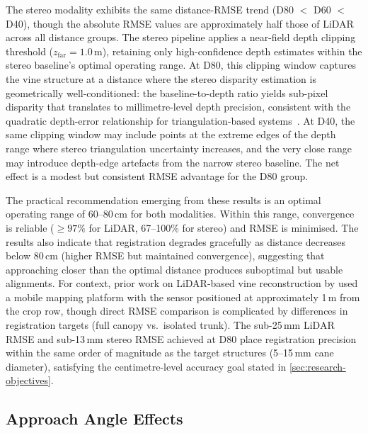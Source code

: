 The stereo modality exhibits the same distance-RMSE trend (D80 $<$ D60 $<$ D40), though the absolute RMSE values are approximately half those of LiDAR across all distance groups. The stereo pipeline applies a near-field depth clipping threshold ($z_\text{far} = 1.0$\,m), retaining only high-confidence depth estimates within the stereo baseline's optimal operating range. At D80, this clipping window captures the vine structure at a distance where the stereo disparity estimation is geometrically well-conditioned: the baseline-to-depth ratio yields sub-pixel disparity that translates to millimetre-level depth precision, consistent with the quadratic depth-error relationship for triangulation-based systems~\cite{hartleyMultipleViewGeometry2004}. At D40, the same clipping window may include points at the extreme edges of the depth range where stereo triangulation uncertainty increases, and the very close range may introduce depth-edge artefacts from the narrow stereo baseline. The net effect is a modest but consistent RMSE advantage for the D80 group.

The practical recommendation emerging from these results is an optimal operating range of 60--80\,cm for both modalities. Within this range, convergence is reliable ($\geq 97\%$ for LiDAR, 67--100\% for stereo) and RMSE is minimised. The results also indicate that registration degrades gracefully as distance decreases below 80\,cm (higher RMSE but maintained convergence), suggesting that approaching closer than the optimal distance produces suboptimal but usable alignments. For context, prior work on LiDAR-based vine reconstruction by \citet{morenoOnGroundVineyardReconstruction2020} used a mobile mapping platform with the sensor positioned at approximately 1\,m from the crop row, though direct RMSE comparison is complicated by differences in registration targets (full canopy vs.\ isolated trunk). The sub-25\,mm LiDAR RMSE and sub-13\,mm stereo RMSE achieved at D80 place registration precision within the same order of magnitude as the target structures (5--15\,mm cane diameter), satisfying the centimetre-level accuracy goal stated in \cref{sec:research-objectives}.

\subsection{Approach Angle Effects}
\label{subsec:pa-discussion-angle}

